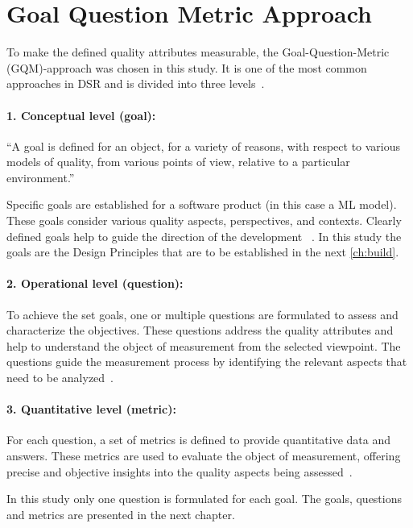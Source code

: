 \section{Goal Question Metric Approach}\label{sec:goal-question-metric-approach}
To make the defined quality attributes measurable, the Goal-Question-Metric (\ac{GQM})-approach was chosen in this
study.
It is one of the most common approaches in DSR and is divided into three levels~\cite[p. 3]{basili_goalquestionmetric_}.

\paragraph{1. Conceptual level (goal):}
``A goal is defined for an object, for a variety of reasons,
with respect to various models of quality, from various points of view, relative to a
particular environment.''
~\cite[p. 3]{basili_goalquestionmetric_}

Specific goals are established for a software product (in this case a \ac{ML} model).
These goals consider various quality aspects, perspectives, and contexts.
Clearly defined goals help to guide the direction of the development
~\cite[p. 3]{basili_goalquestionmetric_}.
In this study the goals are the Design Principles that are to be established in the next \cref{ch:build}.

\paragraph{2. Operational level (question):}
To achieve the set goals, one or multiple questions are formulated to assess and characterize the objectives.
These questions address the quality attributes and help to understand the object of measurement from the selected
viewpoint.
The questions guide the measurement process by identifying the relevant aspects that need to be
analyzed~\cite[p. 3]{basili_goalquestionmetric_}.

\paragraph{3. Quantitative level (metric):}
For each question, a set of metrics is defined to provide quantitative data and answers.
These metrics are used to evaluate the object of measurement, offering precise and objective insights into the
quality aspects being assessed~\cite[p. 3]{basili_goalquestionmetric_}.

In this study only one question is formulated for each goal.
The goals, questions and metrics are presented in the next chapter.
